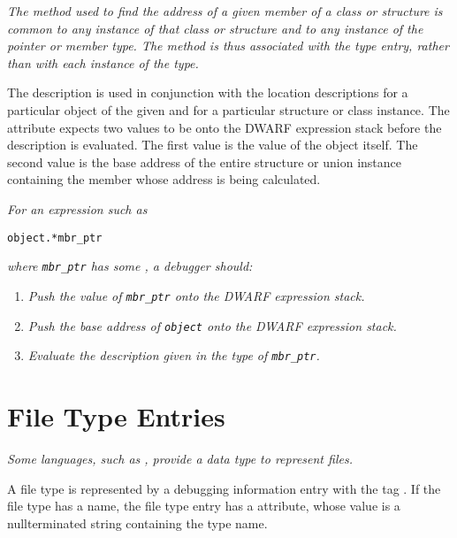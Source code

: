 \textit{The method used to find the address of a given member of a
class or structure is common to any instance of that class
or structure and to any instance of the pointer or member
type. The method is thus associated with the type entry,
rather than with each instance of the type.}

The \DWATuselocation{} description is used in conjunction
with the location descriptions for a particular object of the
given  and for a particular structure or
class instance. The \DWATuselocation{} 
attribute expects two values to be 
onto the DWARF expression stack before
the \DWATuselocation{} description is evaluated.
The first value 
is the value of the  object
itself. The second value 
is the base address of the
entire structure or union instance containing the member
whose address is being calculated.

\textit{For an expression such as}

\begin{lstlisting}[numbers=none]
    object.*mbr_ptr
\end{lstlisting}
\textit{where \texttt{mbr\_ptr} has some , a debugger should:}
\begin{enumerate}[1. ]
\item \textit{Push the value of \texttt{mbr\_ptr} onto the DWARF expression stack.}
\item \textit{Push the base address of \texttt{object} onto the DWARF expression stack.}
\item \textit{Evaluate the \DWATuselocation{} description 
given in the type of \texttt{mbr\_ptr}.}
\end{enumerate}


\section{File Type Entries}
\label{chap:filetypeentries}

\textit{Some languages, such as , 
provide a data type to represent 
files.}

A file type is represented by a debugging information entry
with 
the tag
\DWTAGfiletypeTARG. 
If the file type has a name,
the file type entry has a \DWATname{} attribute,
whose value
is a null\dash terminated string containing the type name.
\bbeb 


